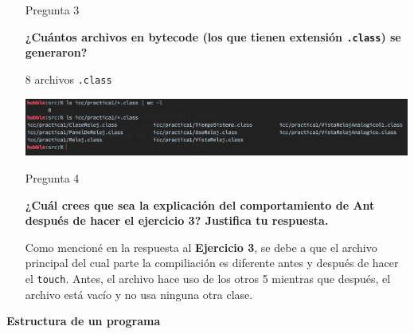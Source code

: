 \documentclass[11pt,letterpaper]{article}
\begin{document}
\begin{enumerate}
        Ambos. Sintácticos porque en algunos casos hacían falta símbolos para delimitar
        el fin de una sentencia (\texttt{;}) o la llamada a un método (\texttt{()}) pero
        de la misma manera había errores semánticos, es decir, relacionados al significado
        del contenido escrito. Por ejemplo: Llamar a la variable inexistente \texttt{relog}
        o ejecutar el método \texttt{espera} de la clase \texttt{VistaRelojAnalogico} sin
        mandarle los argumentos necesarios para que se ejecutara.

    \item [Pregunta 3] {\bfseries ¿Cuántos archivos en bytecode (los que tienen extensión
    \texttt{.class}) se generaron?\par}

        8 archivos \texttt{.class}

        \begin{center}
            \includegraphics[scale=.4]{assets/img/canek-p-3.png}
        \end{center}

    \item [Pregunta 4] {\bfseries ¿Cuál crees que sea la explicación del comportamiento de
    Ant después de hacer el ejercicio 3? Justifica tu respuesta.\par}

        Como mencioné en la respuesta al \textbf{Ejercicio 3}, se debe a que el archivo
        principal del cual parte la compiliación es diferente antes y después de hacer
        el \texttt{touch}. Antes, el archivo hace uso de los otros 5 mientras que después,
        el archivo está vacío y no usa ninguna otra clase.
\end{enumerate}

{\Large \bfseries Estructura de un programa \par}
\end{document}
